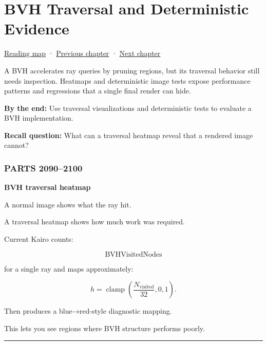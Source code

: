 \chapter{BVH Traversal and Deterministic Evidence}\label{03-visual-computing-i-ch011-bvh-traversal-and-deterministic-evidence}\hypertarget{03-visual-computing-i-ch011}{}\label{stagechapter:03-visual-computing-i-ch011}

\hypertarget{03-visual-computing-i-ch011-bvh-traversal-and-deterministic-evidence}{}

\hyperref[volume-reading-map]{Reading map} · \hyperref[03-visual-computing-i-ch006]{Previous chapter} · \hyperref[03-visual-computing-i-ch016]{Next chapter}

A BVH accelerates ray queries by pruning regions, but its traversal behavior still needs inspection. Heatmaps and deterministic image tests expose performance patterns and regressions that a single final render can hide.

\textbf{By the end:} Use traversal visualizations and deterministic tests to evaluate a BVH implementation.

\textbf{Recall question:} What can a traversal heatmap reveal that a rendered image cannot?

\subsection{PARTS 2090--2100}\label{03-visual-computing-i-ch011-parts-20902100}

\hypertarget{03-visual-computing-i-ch011-parts-20902100}{}

\textbf{BVH traversal heatmap}

A normal image shows what the ray hit.

A traversal heatmap shows how much work was required.

Current Kairo counts:

\[
\text{BVHVisitedNodes}
\]

for a single ray and maps approximately:

\[
h=
\operatorname{clamp}
\left(
\frac{
N_{\text{visited}}
}{
32
},
0,1
\right).
\]

Then produces a blue→red-style diagnostic mapping.

This lets you see regions where BVH structure performs poorly.

\begin{center}\rule{0.5\linewidth}{0.5pt}\end{center}

